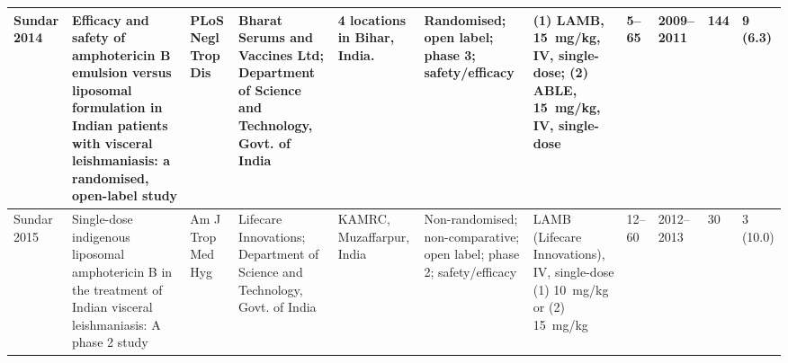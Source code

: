 \begin{ThreePartTable}
\begin{longtable}[c]{L{1.5cm} L{3.5cm} L{1.3cm} L{2.5cm} L{2.5cm} L{2.5cm} L{3cm} L{1.5cm} L{1cm} L{1cm} L{1.3cm}}
    Sundar 2014\cite{sundar2009prot, sundar2014}    & Efficacy and safety of amphotericin B emulsion versus liposomal formulation in Indian patients with visceral leishmaniasis: a randomised, open-label study                                                                  & PLoS Negl Trop Dis       & Bharat Serums and Vaccines Ltd; Department of Science and Technology, Govt. of India & 4 locations in Bihar, India.                      & Randomised; open label; phase 3; safety/efficacy                                   & (1) LAMB, 15~mg/kg, IV, single-dose; (2) ABLE, 15~mg/kg, IV, single-dose                                                                                                                                              & 5--65       & 2009--2011   & 144 & 9 (6.3)                                                                                                                                                                                                                                                                                                                                                                                                                                                                                                                                                                                        \\ \midrule
    Sundar 2015\cite{sundar2011prot,sundar2015}     & Single-dose indigenous liposomal amphotericin B in the treatment of Indian visceral leishmaniasis: A phase 2 study                                                                                                          & Am J Trop Med Hyg        & Lifecare Innovations; Department of Science and Technology, Govt. of India           & KAMRC, Muzaffarpur, India                         & Non-randomised; non-comparative; open label; phase 2; safety/efficacy              & LAMB (Lifecare Innovations), IV, single-dose (1) 10~mg/kg or (2) 15~mg/kg                                                                                                                                             & 12--60      & 2012--2013   & 30           & 3 (10.0)                                                                                                                                                                                                                                                                                                                                                                                                                                                                                                                                                                                       \\ \midrule

\end{longtable}
\end{ThreePartTable}
